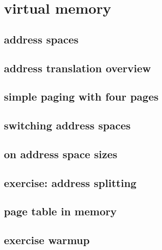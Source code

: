 

\section{virtual memory}

\subsection{address spaces}



\subsection{address translation overview}


\subsection{simple paging with four pages}


\subsection{switching address spaces}


\subsection{on address space sizes}


\subsection{exercise: address splitting}


\subsection{page table in memory}



\subsection{exercise warmup}

